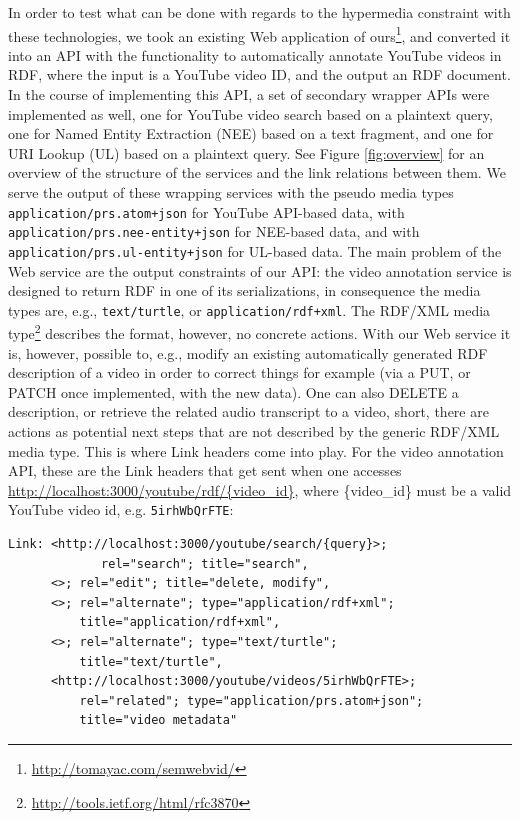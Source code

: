 \documentclass{acm_proc_article-sp}
\begin{document}
In order to test what can be done with regards to the hypermedia constraint with these technologies, we took an existing Web application of ours\footnote{\url{http://tomayac.com/semwebvid/}}, and converted it into an API with the functionality to automatically annotate YouTube videos in RDF, where the input is a YouTube video ID, and the output an RDF document. In the course of implementing this API, a set of secondary wrapper APIs were implemented as well, one for YouTube video search based on a plaintext query, one for Named Entity Extraction (NEE) based on a text fragment, and one for URI Lookup (UL) based on a plaintext query. See Figure \ref{fig:overview} for an overview of the structure of the services and the link relations between them. We serve the output of these wrapping services with the pseudo media types \texttt{application/prs.atom+json} for YouTube API-based data, with \texttt{application/prs.nee-entity+json} for NEE-based data, and with \texttt{application/prs.ul-entity+json} for UL-based data. The main problem of the Web service are the output constraints of our API: the video annotation service is designed to return RDF in one of its serializations, in consequence the media types are, e.g., \texttt{text/turtle}, or \texttt{application/rdf+xml}. The RDF/XML media type\footnote{\url{http://tools.ietf.org/html/rfc3870}} describes the format, however, no concrete actions. With our Web service it is, however, possible to, e.g., modify an existing automatically generated RDF description of a video in order to correct things for example (via a PUT, or PATCH once implemented, with the new data). One can also DELETE a description, or retrieve the related audio transcript to a video, short, there are actions as potential next steps that are not described by the generic RDF/XML media type. This is where Link headers come into play. For the video annotation API, these are the Link headers that get sent when one accesses \url{http://localhost:3000/youtube/rdf/{video_id}}, where \{video\_id\} must be a valid YouTube video id, e.g. \texttt{5irhWbQrFTE}:
\begin{verbatim}
Link: <http://localhost:3000/youtube/search/{query}>;
             rel="search"; title="search",
      <>; rel="edit"; title="delete, modify",
      <>; rel="alternate"; type="application/rdf+xml";
          title="application/rdf+xml",
      <>; rel="alternate"; type="text/turtle";
          title="text/turtle",
      <http://localhost:3000/youtube/videos/5irhWbQrFTE>;
          rel="related"; type="application/prs.atom+json";
          title="video metadata"
\end{verbatim}
\end{document}
